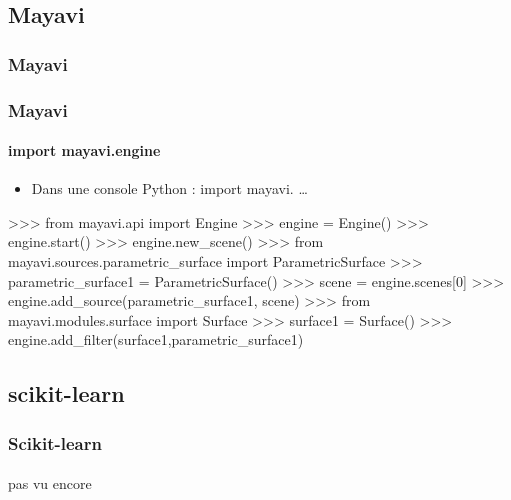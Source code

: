 \subsection{Mayavi}
\begin{frame}
\frametitle{Mayavi}
\framesubtitle{}
{}
\end{frame}
\begin{frame}[fragile]
\frametitle{Mayavi}
\framesubtitle{import mayavi.engine}
\begin{itemize}
 \item Dans une console Python : import mayavi. \dots
\end{itemize}
\begin{pythonConsole}
>>> from mayavi.api import Engine
>>> engine = Engine()
>>> engine.start()
>>> engine.new_scene()
>>> from mayavi.sources.parametric_surface import ParametricSurface
>>> parametric_surface1 = ParametricSurface()
>>> scene = engine.scenes[0]
>>> engine.add_source(parametric_surface1, scene)
>>> from mayavi.modules.surface import Surface
>>> surface1 = Surface()
>>> engine.add_filter(surface1,parametric_surface1)
\end{pythonConsole}
\end{frame}
\subsection{scikit-learn}
\begin{frame}
\frametitle{Scikit-learn}
\framesubtitle{}
pas vu encore
\end{frame}
